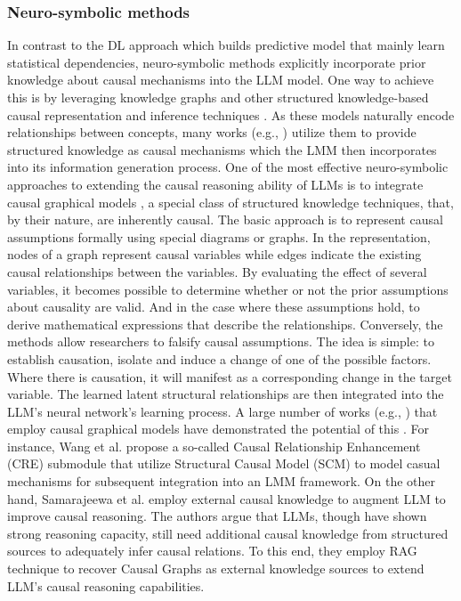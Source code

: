 \documentclass[10pt,journal,compsoc]{IEEEtran}
\begin{document}
	
	
	
	\subsubsection{Neuro-symbolic methods}
	In contrast to the DL approach which builds predictive model that mainly learn statistical dependencies, neuro-symbolic methods explicitly incorporate prior knowledge about causal mechanisms into the LLM model. One way to achieve this is by leveraging knowledge graphs \cite{ji2021survey,pan2024unifying} and other structured knowledge-based causal representation and inference techniques \cite{jonassen2013structural,pinto2019structured,shen2020exploiting}. As these models naturally encode relationships between concepts, many works (e.g., \cite{yang2023chatgpt,yu2024fusing,wang2024llmrg,susanti2024knowledge,ravi2024exploration,wang2024llmrg,abu2024knowledge}) utilize them to provide structured knowledge as causal mechanisms which the LMM then incorporates into its information generation process. 
	One of the most effective neuro-symbolic approaches to extending the causal reasoning ability of LLMs is to integrate causal graphical models \cite{elwert2013graphical,cheng2024data}, a special class of structured knowledge techniques, that, by their nature, are inherently causal. The basic approach is to represent causal assumptions formally using special diagrams or graphs. In the representation, nodes of a graph represent causal variables while edges indicate the existing causal relationships between the variables. By evaluating the effect of several variables, it becomes possible to determine whether or not the prior assumptions about causality are valid. And in the case where these assumptions hold, to derive mathematical expressions that describe the relationships. Conversely, the methods allow researchers to falsify causal assumptions. The idea is simple: to establish causation, isolate and induce a change of one of the possible factors. Where there is causation, it will manifest as a corresponding change in the target variable. The learned latent structural relationships are then integrated into the LLM’s neural network's learning process. A large number of works (e.g., \cite{li2021causalbert,ke2019learning,khetan2022causal}) that employ causal graphical models \cite{elwert2013graphical,cheng2024data} have demonstrated the potential of this . For instance, Wang et al. \cite{wang2024credes} propose a so-called Causal Relationship Enhancement (CRE) submodule that utilize Structural Causal Model (SCM) to model casual mechanisms for subsequent integration into an LMM framework. On the other hand, Samarajeewa et al. \cite{samarajeewa2024causal} employ external causal knowledge to augment LLM to improve causal reasoning. The authors argue that LLMs, though have shown strong reasoning capacity, still need additional causal knowledge from structured sources to adequately infer causal relations. To this end, they employ RAG technique to recover Causal Graphs as external knowledge sources to extend LLM’s causal reasoning capabilities. 
	
\end{document}
